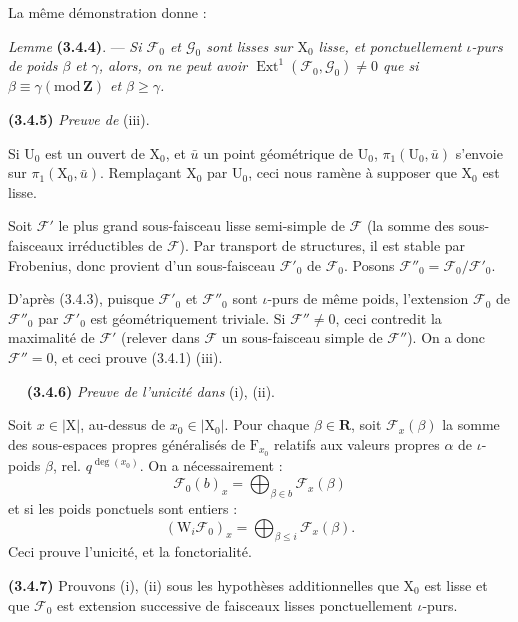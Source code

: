 \documentclass[11pt,leqno]{article}
\newcommand{\Page}[1]{\ifvmode\noindent\else\unskip\ \fi{\footnotesize\textcolor{gray}{[p.\,#1]}}\ \ignorespaces}
\begin{document}
La même démonstration donne :

\textit{Lemme} \textbf{(3.4.4)}. — \textit{Si \(\mathscr{F}_0\) et \(\mathscr{G}_0\) sont lisses sur \(\mathrm{X}_0\) lisse, et ponctuellement \(\iota\)-purs de poids \(\beta\) et \(\gamma\), alors, on ne peut avoir \(\operatorname{Ext}^1(\mathscr{F}_0,\mathscr{G}_0)\neq0\) que si \(\beta\equiv\gamma(\mathrm{mod}\,\mathbf{Z})\) et \(\beta\geq\gamma\).}

\textbf{(3.4.5)} \textit{Preuve de} (iii).

Si \(\mathrm{U}_0\) est un ouvert de \(\mathrm{X}_0\), et \(\bar{u}\) un point géométrique de \(\mathrm{U}_0\), \(\pi_1(\mathrm{U}_0,\bar{u})\) s’envoie sur \(\pi_1(\mathrm{X}_0,\bar{u})\). Remplaçant \(\mathrm{X}_0\) par \(\mathrm{U}_0\), ceci nous ramène à supposer que \(\mathrm{X}_0\) est lisse.

Soit \(\mathscr{F}'\) le plus grand sous-faisceau lisse semi-simple de \(\mathscr{F}\) (la somme des sous-faisceaux irréductibles de \(\mathscr{F}\)). Par transport de structures, il est stable par Frobenius, donc provient d’un sous-faisceau \(\mathscr{F}'_0\) de \(\mathscr{F}_0\). Posons \(\mathscr{F}''_0=\mathscr{F}_0/\mathscr{F}'_0\).

D’après (3.4.3), puisque \(\mathscr{F}'_0\) et \(\mathscr{F}''_0\) sont \(\iota\)-purs de même poids, l’extension \(\mathscr{F}_0\) de \(\mathscr{F}''_0\) par \(\mathscr{F}'_0\) est géométriquement triviale. Si \(\mathscr{F}''\neq0\), ceci contredit la maximalité de \(\mathscr{F}'\) (relever dans \(\mathscr{F}\) un sous-faisceau simple de \(\mathscr{F}''\)). On a donc \(\mathscr{F}''=0\), et ceci prouve (3.4.1) (iii).

\Page{209}
\textbf{(3.4.6)} \textit{Preuve de l’unicité dans} (i), (ii).

Soit \(x\in|\mathrm X|\), au-dessus de \(x_0\in|\mathrm X_0|\). Pour chaque \(\beta\in\mathbf R\), soit \(\mathscr F_x(\beta)\) la somme des sous-espaces propres généralisés de \(\mathrm F_{x_0}\) relatifs aux valeurs propres \(\alpha\) de \(\iota\)-poids \(\beta\), rel. \(q^{\deg(x_0)}\). On a nécessairement :
\[
\mathscr F_0(b)_x=\bigoplus_{\beta\in b}\mathscr F_x(\beta)
\]
et si les poids ponctuels sont entiers :
\[
(\mathrm W_i\mathscr F_0)_x=\bigoplus_{\beta\leq i}\mathscr F_x(\beta).
\]
Ceci prouve l’unicité, et la fonctorialité.

\textbf{(3.4.7)} Prouvons (i), (ii) sous les hypothèses additionnelles que \(\mathrm X_0\) est lisse et que \(\mathscr F_0\) est extension successive de faisceaux lisses ponctuellement \(\iota\)-purs.
\end{document}
